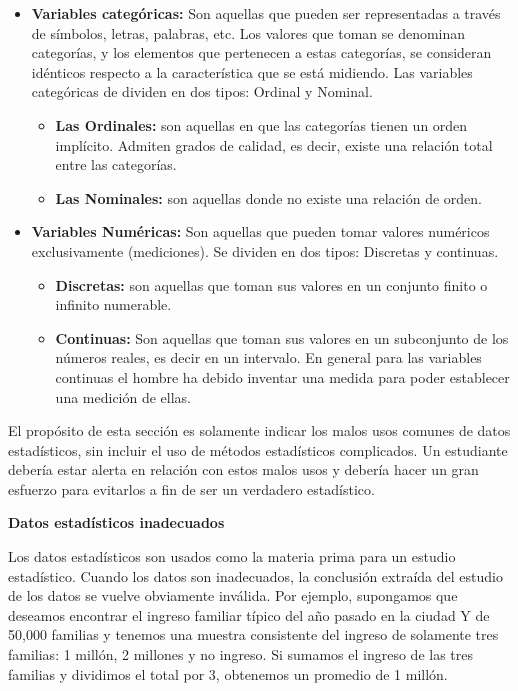 \begin{itemize}
    \item \textbf{Variables categ\'oricas:} Son aquellas que pueden ser representadas a trav\'es de s\'imbolos, letras, palabras, etc. Los valores que toman se denominan categor\'ias, y los elementos que pertenecen a estas categor\'ias, se consideran id\'enticos respecto a la caracter\'istica que se est\'a midiendo. Las variables categ\'oricas de dividen en dos tipos: Ordinal y Nominal.
    \begin{itemize}
        \item \textbf{Las Ordinales:} son aquellas en que las categor\'ias tienen un orden impl\'icito. Admiten grados de calidad, es decir, existe una relaci\'on total entre las categor\'ias.
        \item \textbf{Las Nominales:} son aquellas donde no existe una relaci\'on de orden.
    \end{itemize}
    \item \textbf{Variables Num\'ericas:} Son aquellas que pueden tomar valores num\'ericos exclusivamente (mediciones). Se dividen en dos tipos: Discretas y continuas.
    \begin{itemize}
        \item \textbf{Discretas:} son aquellas que toman sus valores en un conjunto finito o infinito numerable.
        \item \textbf{Continuas:} Son aquellas que toman sus valores en un subconjunto de los n\'umeros reales, es decir en un intervalo. En general para las variables continuas el hombre ha debido inventar una medida para poder establecer una medici\'on de ellas.
    \end{itemize}
\end{itemize}

El prop\'osito de esta secci\'on es solamente indicar los malos usos comunes de datos estad\'isticos, sin incluir el uso de m\'etodos estad\'isticos complicados. Un estudiante deber\'ia estar alerta en relaci\'on con estos malos usos y deber\'ia hacer un gran esfuerzo para evitarlos a fin de ser un verdadero estad\'istico.

\textbf{Datos estad\'isticos inadecuados}

Los datos estad\'isticos son usados como la materia prima para un estudio estad\'istico. Cuando los datos son inadecuados, la conclusi\'on extra\'ida del estudio de los datos se vuelve obviamente inv\'alida. Por ejemplo, supongamos que deseamos encontrar el ingreso familiar t\'ipico del a\~no pasado en la ciudad Y de 50,000 familias y tenemos una muestra consistente del ingreso de solamente tres familias: 1 mill\'on, 2 millones y no ingreso. Si sumamos el ingreso de las tres familias y dividimos el total por 3, obtenemos un promedio de 1 mill\'on.

